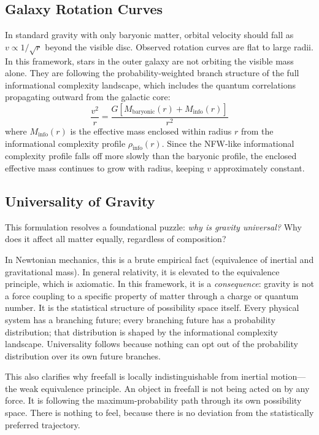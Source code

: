 \documentclass[12pt,a4paper]{article}
\begin{document}
\subsection{Galaxy Rotation Curves}

In standard gravity with only baryonic matter, orbital velocity should fall as $v \propto 1/\sqrt{r}$ beyond the visible disc. Observed rotation curves are flat to large radii. In this framework, stars in the outer galaxy are not orbiting the visible mass alone. They are following the probability-weighted branch structure of the full informational complexity landscape, which includes the quantum correlations propagating outward from the galactic core:
\begin{equation}
    \frac{v^2}{r} = \frac{G\left[M_{\mathrm{baryonic}}(r) + M_{\mathrm{info}}(r)\right]}{r^2}
    \label{eq:rotation}
\end{equation}
where $M_{\mathrm{info}}(r)$ is the effective mass enclosed within radius $r$ from the informational complexity profile $\rho_{\mathrm{info}}(r)$. Since the NFW-like informational complexity profile falls off more slowly than the baryonic profile, the enclosed effective mass continues to grow with radius, keeping $v$ approximately constant.

\subsection{Universality of Gravity}
\label{sec:universality}

This formulation resolves a foundational puzzle: \emph{why is gravity universal?} Why does it affect all matter equally, regardless of composition?

In Newtonian mechanics, this is a brute empirical fact (equivalence of inertial and gravitational mass). In general relativity, it is elevated to the equivalence principle, which is axiomatic. In this framework, it is a \emph{consequence}: gravity is not a force coupling to a specific property of matter through a charge or quantum number. It is the statistical structure of possibility space itself. Every physical system has a branching future; every branching future has a probability distribution; that distribution is shaped by the informational complexity landscape. Universality follows because nothing can opt out of the probability distribution over its own future branches.

This also clarifies why freefall is locally indistinguishable from inertial motion---the weak equivalence principle. An object in freefall is not being acted on by any force. It is following the maximum-probability path through its own possibility space. There is nothing to feel, because there is no deviation from the statistically preferred trajectory.
\end{document}
